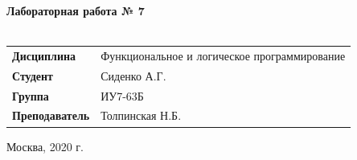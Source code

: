 \documentclass[a4paper,14pt]{extreport} %
\begin{document}
\begin{titlepage}
    \vspace{2cm}

    \begin{center}
        \textbf{Лабораторная работа № 7} \\
        \vspace{0.5cm}
        \textbf{} \\
    \end{center}

    \vspace{4cm}

    \begin{flushleft}
        \begin{tabular}{ll}
            \textbf{Дисциплина} & Функциональное и логическое программирование \\
            \textbf{Студент} & Сиденко А.Г. \\
            \textbf{Группа} & ИУ7-63Б \\
            \textbf{Преподаватель} & Толпинская Н.Б.  \\
        \end{tabular}
    \end{flushleft}

    \vspace{4cm}

   \begin{center}
        Москва, 2020 г.
    \end{center}

\end{titlepage}
\end{document}
